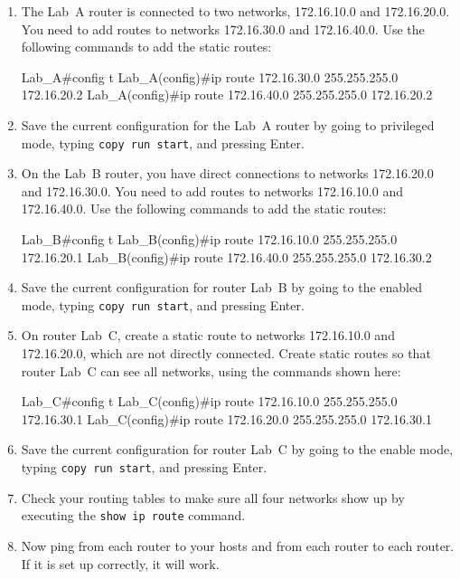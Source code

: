 \begin{enumerate}
\item
  The Lab~A router is connected to two networks, 172.16.10.0 and
  172.16.20.0. You need to add routes to networks 172.16.30.0 and
  172.16.40.0. Use the following commands to add the static routes:

\begin{cli}
Lab_A#config t
Lab_A(config)#ip route 172.16.30.0 255.255.255.0
  172.16.20.2
Lab_A(config)#ip route 172.16.40.0 255.255.255.0
  172.16.20.2
\end{cli}
\item
  Save the current configuration for the Lab~A router by going to
  privileged mode, typing \texttt{copy\ run\ start}, and pressing Enter.
\item
  On the Lab~B router, you have direct connections to networks
  172.16.20.0 and 172.16.30.0. You need to add routes to networks
  172.16.10.0 and 172.16.40.0. Use the following commands to add the
  static routes:

\begin{cli}
Lab_B#config t
Lab_B(config)#ip route 172.16.10.0 255.255.255.0
  172.16.20.1
Lab_B(config)#ip route 172.16.40.0 255.255.255.0
  172.16.30.2
\end{cli}
\item
  Save the current configuration for router Lab~B by going to the
  enabled mode, typing \texttt{copy\ run\ start}, and pressing Enter.
\item
  On router Lab~C, create a static route to networks 172.16.10.0 and
  172.16.20.0, which are not directly connected. Create static routes so
  that router Lab~C can see all networks, using the commands shown
  here:

\begin{cli}
Lab_C#config t
Lab_C(config)#ip route 172.16.10.0 255.255.255.0
  172.16.30.1
Lab_C(config)#ip route 172.16.20.0 255.255.255.0
  172.16.30.1
\end{cli}
\item
  Save the current configuration for router Lab~C by going to the
  enable mode, typing \texttt{copy\ run\ start}, and pressing Enter.
\item
  \protect\hypertarget{c09.xhtmlux5cux23Page_403}{}{}Check your routing
  tables to make sure all four networks show up by executing the
  \texttt{show\ ip\ route} command.
\item
  Now ping from each router to your hosts and from each router to each
  router. If it is set up correctly, it will work.
\end{enumerate}

